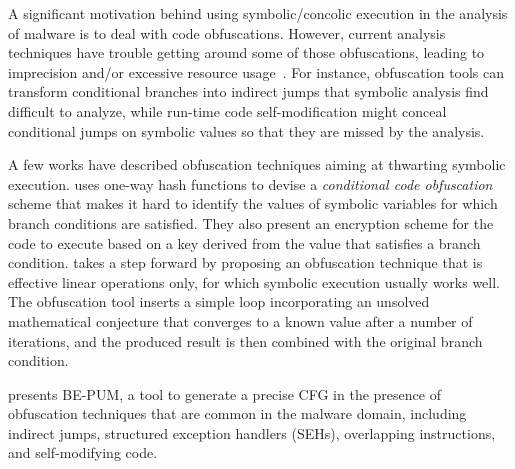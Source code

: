 A significant motivation behind using symbolic/concolic execution in the analysis of malware is to deal with code obfuscations. However, current analysis techniques have trouble getting around some of those obfuscations, leading to imprecision and/or excessive resource usage~\cite{YD-CCS15}. For instance, obfuscation tools can transform conditional branches into indirect jumps that symbolic analysis find difficult to analyze, while run-time code self-modification might conceal conditional jumps on symbolic values so that they are missed by the analysis.

A few works have described obfuscation techniques aiming at thwarting symbolic execution. \cite{SLG-NDSS08} uses one-way hash functions to devise a {\em conditional code obfuscation} scheme that makes it hard to identify the values of symbolic variables for which branch conditions are satisfied. They also present an encryption scheme for the code to execute based on a key derived from the value that satisfies a branch condition. %
\cite{WMJ-ESORICS11} takes a step forward by proposing an obfuscation technique that is effective  linear operations only, for which symbolic execution usually works well. %
The obfuscation tool inserts a simple loop incorporating an unsolved mathematical conjecture that converges to a known value after a number of iterations, and the produced result is then combined with the original branch condition. %

\cite{HOT-FPS15} presents BE-PUM, a tool to generate a precise CFG in the presence of obfuscation techniques that are common in the malware domain, including indirect jumps, structured exception handlers (SEHs), overlapping instructions, and self-modifying code.  %

